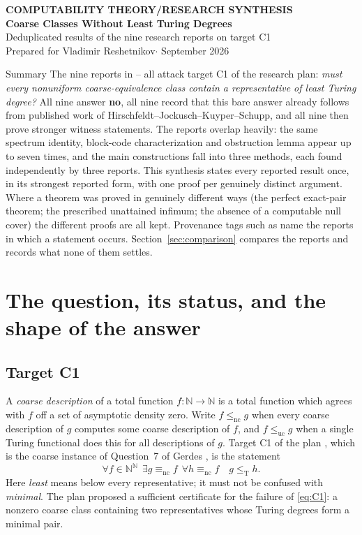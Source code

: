 \documentclass[11pt,letterpaper]{article}
\theoremstyle{definition}
\numberwithin{equation}{section}
\newcommand{\N}{\mathbb N}
\newcommand{\Baire}{\N^{\N}}
\newcommand{\leT}{\le_{\mathrm T}}
\newcommand{\lenc}{\le_{\mathrm{nc}}}
\newcommand{\leuc}{\le_{\mathrm{uc}}}
\newcommand{\eqnc}{\equiv_{\mathrm{nc}}}
\newcommand{\src}[1]{\leavevmode{\sffamily\footnotesize\color{Steel}[#1]}}
\begin{document}
\thispagestyle{plain}
\begin{center}
{\sffamily\small\bfseries\color{Steel}COMPUTABILITY THEORY\quad/\quad RESEARCH SYNTHESIS}\\[10pt]
{\fontsize{22}{27}\selectfont\bfseries\color{Navy}Coarse Classes Without Least Turing Degrees}\\[7pt]
{\large\color{Ink}Deduplicated results of the nine research reports on target C1}\\[9pt]
{\color{Muted}Prepared for Vladimir Reshetnikov\quad$\cdot$ September 2026}
\end{center}
\vspace{2pt}
\begin{assessment}{Summary}
The nine reports in -- all attack target C1 of the research plan: \emph{must every nonuniform coarse-equivalence class contain a representative of least Turing degree?} All nine answer \textbf{no}, all nine record that this bare answer already follows from published work of Hirschfeldt--Jockusch--Kuyper--Schupp, and all nine then prove stronger witness statements. The reports overlap heavily: the same spectrum identity, block-code characterization and obstruction lemma appear up to seven times, and the main constructions fall into three methods, each found independently by three reports. This synthesis states every reported result once, in its strongest reported form, with one proof per genuinely distinct argument. Where a theorem was proved in genuinely different ways (the perfect exact-pair theorem; the prescribed unattained infimum; the absence of a computable null cover) the different proofs are all kept. Provenance tags such as \src{R1, R8} name the reports in which a statement occurs. Section~\ref{sec:comparison} compares the reports and records what none of them settles.
\end{assessment}
{\small\tableofcontents}

\section{The question, its status, and the shape of the answer}\label{sec:overview}
\subsection{Target C1}
A \emph{coarse description} of a total function $f:\N\to\N$ is a total function which agrees with $f$ off a set of asymptotic density zero. Write $f\lenc g$ when every coarse description of $g$ computes some coarse description of $f$, and $f\leuc g$ when a single Turing functional does this for all descriptions of $g$. Target C1 of the plan \cite{Plan}, which is the coarse instance of Question~7 of Gerdes \cite{Gerdes}, is the statement
\begin{equation}\tag{C1}\label{eq:C1}
 \forall f\in\Baire\ \ \exists g\eqnc f\ \ \forall h\eqnc f\quad g\leT h .
\end{equation}
Here \emph{least} means below every representative; it must not be confused with \emph{minimal}. The plan proposed a sufficient certificate for the failure of \eqref{eq:C1}: a nonzero coarse class containing two representatives whose Turing degrees form a minimal pair.
\end{document}
